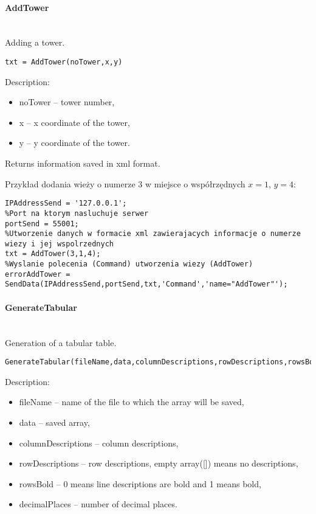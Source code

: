 \paragraph{AddTower} \hspace{0pt} \\

Adding a tower.
\begin{lstlisting}[style=Matlab-editor]
txt = AddTower(noTower,x,y)
\end{lstlisting}

Description:
\begin{itemize}
\item noTower -- tower number,
\item x -- x coordinate of the tower,
\item y -- y coordinate of the tower.
\end{itemize}

Returns information saved in xml format.

Przykład dodania wieży o numerze 3 w miejsce o współrzędnych $x=1$, $y = 4$: 
\begin{lstlisting}[style=Matlab-editor]
%Adres serwera
IPAddressSend = '127.0.0.1';
%Port na ktorym nasluchuje serwer
portSend = 55001;
%Utworzenie danych w formacie xml zawierajacych informacje o numerze wiezy i jej wspolrzednych
txt = AddTower(3,1,4);
%Wyslanie polecenia (Command) utworzenia wiezy (AddTower)
errorAddTower = SendData(IPAddressSend,portSend,txt,'Command','name="AddTower"');
\end{lstlisting}

\paragraph{GenerateTabular} \hspace{0pt} \\
Generation of a tabular table.
\begin{lstlisting}[style=Matlab-editor]
GenerateTabular(fileName,data,columnDescriptions,rowDescriptions,rowsBold,decimalPlaces)
\end{lstlisting}

Description:
\begin{itemize}
\item fileName -- name of the file to which the array will be saved,
\item data -- saved array,
\item columnDescriptions -- column descriptions,
\item rowDescriptions -- row descriptions, empty array([]) means no descriptions,
\item rowsBold -- 0 means line descriptions are bold and 1 means bold,
\item decimalPlaces -- number of decimal places.
\end{itemize}

